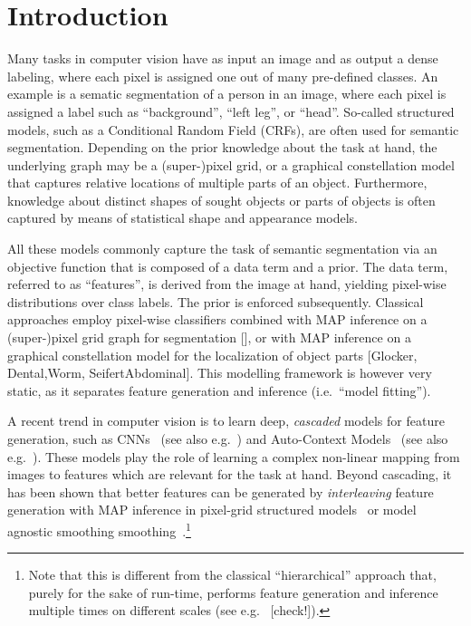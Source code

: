 \documentclass[10pt,twocolumn,letterpaper]{article}
\begin{document}
\section{Introduction}
Many tasks in computer vision have as input an image and as output a dense labeling, where each pixel is assigned one out of many pre-defined classes. An example is a sematic segmentation of a person in an image, where each pixel is assigned a label such as “background”, “left leg”, or “head”. 
%
So-called structured models, such as a Conditional Random Field (CRFs), are often used for semantic segmentation. 
Depending on the prior knowledge about the task at hand, the underlying graph may be a (super-)pixel grid, or a graphical constellation model that captures relative locations of multiple parts of an object. 
%
Furthermore, knowledge about distinct shapes of sought objects or parts of objects is often captured by means of statistical shape and appearance models. 

All these models commonly capture the task of semantic segmentation via an objective function that is composed of a data term and a prior. 
%
The data term, referred to as "`features"', is derived from the image at hand, yielding pixel-wise distributions over class labels. The prior is enforced subsequently. 
%
%
Classical approaches employ pixel-wise classifiers combined with MAP inference on a (super-)pixel grid graph for segmentation [], or with MAP inference on a graphical constellation model for the localization of object parts [Glocker, Dental,Worm, SeifertAbdominal].  
%
This modelling framework is however very static, as it separates feature generation and inference (i.e.\ "`model fitting"'). 

A recent trend in computer vision is to learn deep, \emph{cascaded} models for feature generation, such as CNNs~\cite{NIPS2012_4824} (see also e.g.\ \cite{funke2014candidate}) and Auto-Context Models~\cite{AutoContext2008} (see also e.g.\ \cite{PoseMachinesECCV2014}). 
%
These models play the role of learning a complex non-linear mapping from images to features which are relevant for the task at hand. 
%
Beyond cascading, it has been shown that better features can be generated by \emph{interleaving} feature generation with MAP inference in pixel-grid structured models~\cite{DTF,RTF,UweCVPR2013} 
%
or model agnostic smoothing smoothing~\cite{GeoForests2013}.\footnote{Note that this is different from the classical "`hierarchical"' approach that, purely for the sake of run-time, performs feature generation and inference multiple times on different scales (see e.g.\ \cite{CootesECCV2012RRFandSSM,CootesFemurTMI2013} [check!]).}
\end{document}
